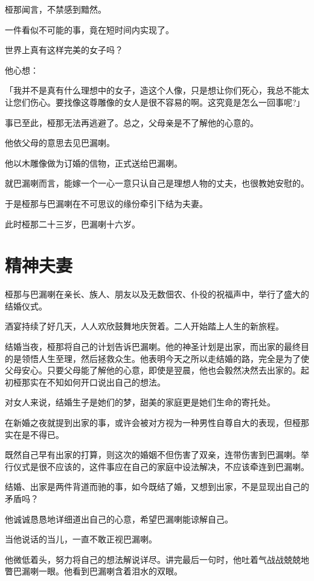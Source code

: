 \documentclass[twoside,openany]{book}
\begin{document}
桠那闻言，不禁感到黯然。

一件看似不可能的事，竟在短时间内实现了。

世界上真有这样完美的女子吗？

他心想：

「我并不是真有什么理想中的女子，造这个人像，只是想让你们死心，我总不能太让您们伤心。要找像这尊雕像的女人是很不容易的啊。这究竟是怎么一回事呢?」

事已至此，桠那无法再逃避了。总之，父母亲是不了解他的心意的。

他依父母的意思去见巴漏喇。

他以木雕像做为订婚的信物，正式送给巴漏喇。

就巴漏喇而言，能嫁一个一心一意只认自己是理想人物的丈夫，也很教她安慰的。

于是桠那与巴漏喇在不可思议的缘份牵引下结为夫妻。

此时桠那二十三岁，巴漏喇十六岁。

\section{精神夫妻}\label{sec4.3}

桠那与巴漏喇在亲长、族人、朋友以及无数佃农、仆役的祝福声中，举行了盛大的结婚仪式。

酒宴持续了好几天，人人欢欣鼓舞地庆贺着。二人开始踏上人生的新旅程。

结婚当夜，桠那将自己的计划告诉巴漏喇。他的神圣计划是出家，而出家的最终目的是领悟人生至理，然后拯救众生。他表明今天之所以走结婚的路，完全是为了使父母安心。只要父母能了解他的心意，即使是翌晨，他也会毅然决然去出家的。起初桠那实在不知如何开口说出自己的想法。

对女人来说，结婚生子是她们的梦，甜美的家庭更是她们生命的寄托处。

在新婚之夜就提到出家的事，或许会被对方视为一种男性自尊自大的表现，但桠那实在是不得已。

既然自己早有出家的打算，则这次的婚姻不但伤害了双亲，连带伤害到巴漏喇。举行仪式是很不应该的，这件事应在自己的家庭中设法解决，不应该牵连到巴漏喇。

结婚、出家是两件背道而驰的事，如今既结了婚，又想到出家，不是显现出自己的矛盾吗？

他诚诚恳恳地详细道出自己的心意，希望巴漏喇能谅解自己。

当他说话的当儿，一直不敢正视巴漏喇。

他微低着头，努力将自己的想法解说详尽。讲完最后一句时，他吐着气战战兢兢地瞥巴漏喇一眼。他看到巴漏喇含着泪水的双眼。
\end{document}
